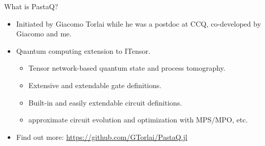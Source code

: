 \begin{frame}{What is PastaQ?}

\begin{itemize}[<+->]

  \item Initiated by Giacomo Torlai while he was a postdoc at CCQ, co-developed by Giacomo and me.
  \item Quantum computing extension to ITensor.

  \begin{itemize}[<+->]

    \item Tensor network-based quantum state and process tomography. 
    \item Extensive and extendable gate definitions.
    \item Built-in and easily extendable circuit definitions.
    \item approximate circuit evolution and optimization with MPS/MPO, etc.

  \end{itemize}

  \item Find out more: \url{https://github.com/GTorlai/PastaQ.jl}

\end{itemize}

\end{frame}
